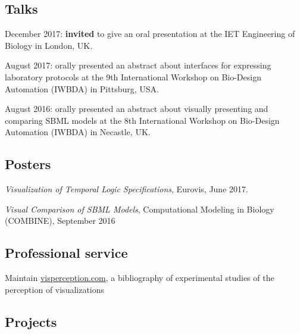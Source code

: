 \documentclass[letterpaper]{article}
\renewenvironment{itemize}{
  \begin{compactitem}{}{
    \setlength{\leftmargin}{1.5em}
  }
}{
  \end{compactitem}
}
\begin{document}
\subsection{Talks}\label{talks}

\begin{itemize}
\item
  December 2017: \textbf{invited} to give an oral presentation at the
  IET Engineering of Biology in London, UK.
\item
  August 2017: orally presented an abstract about interfaces for
  expressing laboratory protocols at the 9th International Workshop on
  Bio-Design Automation (IWBDA) in Pittsburg, USA.
\item
  August 2016: orally presented an abstract about visually presenting
  and comparing SBML models at the 8th International Workshop on
  Bio-Design Automation (IWBDA) in Necastle, UK.
\end{itemize}

\subsection{Posters}\label{posters}

\begin{itemize}
\tightlist
\item
  \emph{Visualization of Temporal Logic Specifications}, Eurovis, June
  2017.
\item
  \emph{Visual Comparison of SBML Models}, Computational Modeling in
  Biology (COMBINE), September 2016
\end{itemize}

\subsection{Professional service}\label{professional-service}

\begin{itemize}
\tightlist
\item
  Maintain \href{http://visperception.com}{visperception.com}, a
  bibliography of experimental studies of the perception of
  visualizations
\end{itemize}

\subsection{Projects}\label{projects}
\end{document}
